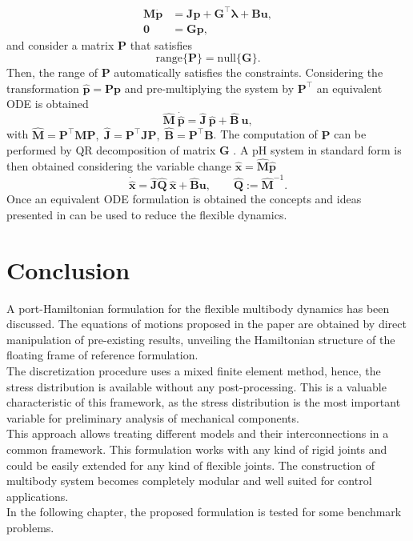 \begin{equation}
\begin{aligned}
\mathbf{M} \dot{\mathbf{p}} &=  \mathbf{J}\mathbf{p} + \mathbf{G}^\top \bm{\lambda} + \mathbf{B}\mathbf{u}, \\ 
\mathbf{0} &= \mathbf{G}\mathbf{p},
\end{aligned}
\end{equation}
and consider a matrix $\mathbf{P}$ that satisfies 
\[
\mathrm{range}\{\mathbf{P}\} = \mathrm{null}\{\mathbf{G}\}.
\]
Then, the range of $\mathbf{P}$ automatically satisfies the constraints. Considering the transformation $\widehat{\mathbf{p}} = \mathbf{P} \mathbf{p}$ and pre-multiplying the system by $\mathbf{P}^\top$ an equivalent ODE is obtained
\[
\widehat{\mathbf{M}} \ \dot{\widehat{\mathbf{p}}} =  \widehat{\mathbf{J}} \ \widehat{\mathbf{p}} + \widehat{\mathbf{B}} \ \mathbf{u},
\]
with $\widehat{\mathbf{M}} = \mathbf{P}^\top \mathbf{M} \mathbf{P}, \; \widehat{\mathbf{J}} = \mathbf{P}^\top \mathbf{J} \mathbf{P}, \; \widehat{\mathbf{B}} = \mathbf{P}^\top \mathbf{B}$. The computation of $\mathbf{P}$ can be performed by QR decomposition of matrix $\mathbf{G}$ \cite{leyendecker2008nullspace}. A pH system in standard form is then obtained considering the variable change $\widehat{\mathbf{x}} = \widehat{\mathbf{M}} \widehat{\mathbf{p}}$
\[ \dot{\widehat{\mathbf{x}}} =  \widehat{\mathbf{J}} \widehat{\mathbf{Q}}\ \widehat{\mathbf{x}} + \widehat{\mathbf{B}}  \mathbf{u}, \qquad \widehat{\mathbf{Q}}:= \widehat{\mathbf{M}}^{-1}.
\] 
Once an equivalent ODE formulation is obtained the concepts and ideas presented in \cite{chaturantabut2016} can be used to reduce the flexible dynamics.


\section{Conclusion}
A port-Hamiltonian formulation for the flexible multibody dynamics has been discussed. The equations of motions proposed in the paper  are obtained by direct manipulation of pre-existing results, unveiling the Hamiltonian structure of the floating frame of reference formulation. \\
\indent The discretization procedure uses a mixed finite element method, hence, the stress distribution is available without any post-processing. This is a valuable characteristic of this framework, as the stress distribution is the most important variable for preliminary analysis of mechanical components. \\
\indent This approach allows treating different models and their interconnections in a common framework. This formulation works with any kind of rigid joints and could be easily extended for any kind of flexible joints. The construction of multibody system becomes completely modular and well suited for control applications. \\
\indent In the following chapter, the proposed formulation is tested for some benchmark problems.

